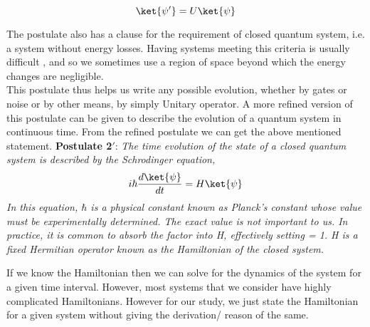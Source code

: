 				$$\ket{\psi'} = U\ket{\psi} $$
\par
The postulate also has a clause for the requirement of closed quantum system, i.e. a system without energy losses. Having systems meeting this criteria is usually difficult , and so we sometimes use a region of space beyond which the energy changes are negligible.
\\
This postulate thus helps us write any possible evolution, whether by gates or noise or by other means, by simply Unitary operator. A more refined version of this postulate can be given to describe the evolution of a quantum system in continuous time. From the refined postulate we can get the above mentioned statement.\newpage
\textbf{Postulate 2$'$}: \textit{The time evolution of the state of a closed quantum system is described by the Schrodinger equation,}
$$ i\hbar \frac{d\ket{\psi}}{d t} = H \ket{\psi}$$
\textit{In this equation, $\hbar$ is a physical constant known as Planck’s constant whose value must be experimentally determined. The exact value is not important to us. In practice, it is common to absorb the factor into H, effectively setting  = 1. H is a fixed Hermitian operator known as the Hamiltonian of the closed system.}
\par If we know the Hamiltonian then we can solve for the dynamics of the system for a given time interval. However, most systems that we consider have highly complicated Hamiltonians. However for our study, we just state the Hamiltonian for a given system without giving the derivation/ reason of the same.

